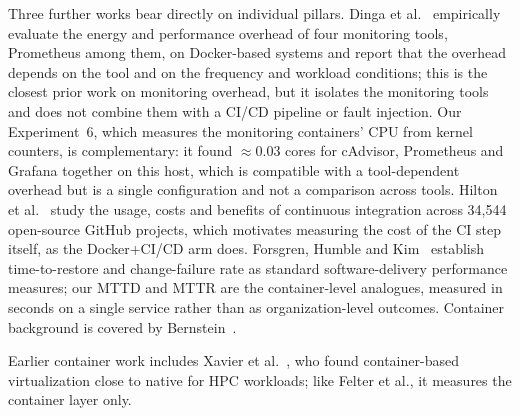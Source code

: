 \documentclass[conference]{IEEEtran}
\begin{document}
Three further works bear directly on individual pillars. Dinga et
al.~\cite{dinga2023} empirically evaluate the energy and performance overhead
of four monitoring tools, Prometheus among them, on Docker-based systems and
report that the overhead depends on the tool and on the frequency and workload
conditions; this is the closest prior work on monitoring overhead, but it
isolates the monitoring tools and does not combine them with a CI/CD pipeline
or fault injection. Our Experiment~6, which measures the monitoring
containers' CPU from kernel counters, is complementary: it found
$\approx$0.03 cores for cAdvisor, Prometheus and Grafana together on this host,
which is compatible with a tool-dependent overhead but is a single
configuration and not a comparison across tools. Hilton et
al.~\cite{hilton2016} study the usage, costs and benefits of continuous
integration across 34{,}544 open-source GitHub projects, which motivates
measuring the cost of the CI step itself, as the Docker+CI/CD arm does.
Forsgren, Humble and Kim~\cite{forsgren2018} establish time-to-restore and
change-failure rate as standard software-delivery performance measures; our
MTTD and MTTR are the container-level analogues, measured in seconds on a
single service rather than as organization-level outcomes. Container
background is covered by Bernstein~\cite{bernstein2014}.

Earlier container work includes Xavier et
al.~\cite{xavier2013}, who found container-based virtualization close to native for
HPC workloads; like Felter et al., it measures the container layer only.
\end{document}
